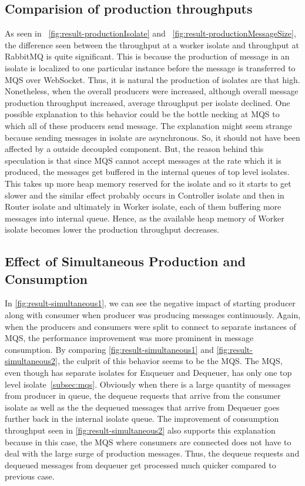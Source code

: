 \subsection{Comparision of production throughputs}
  As seen in ~\autoref{fig:result-productionIsolate} and ~\autoref{fig:result-productionMessageSize}, the difference seen between the throughput at a worker isolate and throughput at RabbitMQ is quite significant. This is because the production of message in an isolate is localized to one particular instance before the message is transferred to MQS over WebSocket. Thus, it is natural the production of isolates are that high. Nonetheless, when the overall producers were increased, although overall message production throughput increased, average throughput per isolate declined. One possible explanation to this behavior could be the bottle necking at MQS to which all of these producers send message. The explanation might seem strange because sending messages in isolate are asynchronous. So, it should not have been affected by a outside decoupled component. But, the reason behind this speculation is that since MQS cannot accept messages at the rate which it is produced, the messages get buffered in the internal queues of top level isolates. This takes up more heap memory reserved for the isolate and so it starts to get slower and the similar effect probably occurs in Controller isolate and then in Router isolate and ultimately in Worker isolate, each of them buffering more messages into internal queue. Hence, as the available heap memory of Worker isolate becomes lower the production throughput decreases.

\subsection{Effect of Simultaneous Production and Consumption}
In \autoref{fig:result-simultaneous1}, we can see the negative impact of starting producer along with consumer when producer was producing messages continuously. Again, when the producers and consumers were split to connect to separate instances of MQS, the performance improvement was more prominent in message consumption.
  By comparing \autoref{fig:result-simultaneous1} and \autoref{fig:result-simultaneous2}, the culprit of this behavior seems to be the MQS. The MQS, even though has separate isolates for Enqueuer and Dequeuer, has only one top level isolate~\autoref{subsec:mqs}. Obviously when there is a large quantity of messages from producer in queue, the dequeue requests that arrive from the consumer isolate as well as the the dequeued messages that arrive from Dequeuer goes further back in the internal isolate queue. The improvement of consumption throughput seen in
   \autoref{fig:result-simultaneous2} also supports this explanation because in this case, the MQS where consumers are connected does not have to deal with the large surge of production messages. Thus, the dequeue requests and dequeued messages from dequeuer get processed much quicker compared to previous case.

